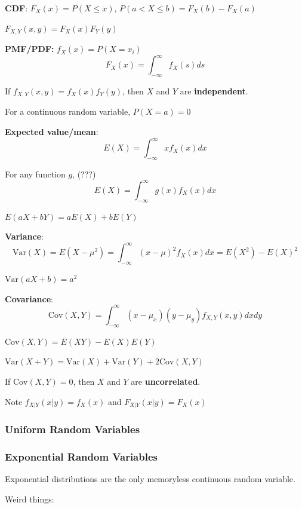 \documentclass{report}
\newcommand{\Var}{\text{Var}}
\newcommand{\Cov}{\text{Cov}}
\begin{document}
\textbf{CDF}: $F_X(x) = P(X \leq x)$, $P(a < X \leq b) = F_X(b) - F_X(a)$

$F_{X,Y}(x,y) = F_X(x)F_Y(y)$

\textbf{PMF/PDF:} $f_X(x) = P(X = x_i)$ $$F_X(x) = \int_{-\infty}^{\infty} f_X(s) ds$$

If $f_{X,Y}(x,y) = f_X(x)f_Y(y)$, then $X$ and $Y$ are \textbf{independent}.

For a continuous random variable, $P(X = a)=0$

\textbf{Expected value/mean}: $$E(X) = \int_{-\infty}^{\infty} x f_X(x) dx$$

For any function $g$, (???)  $$E(X) = \int_{-\infty}^{\infty} g(x) f_X(x) dx$$

$E(aX + bY) = aE(X) + bE(Y)$

\textbf{Variance}: $$\text{Var}(X) = E(X - \mu^2) = \int_{-\infty}^{\infty} (x - \mu)^2 f_X(x) dx = E(X^2) - E(X)^2$$

$\text{Var}(aX + b) = a^2 $

\textbf{Covariance}: $$\text{Cov}(X,Y) = \int_{-\infty}^{\infty} (x - \mu_x)(y -\mu_y) f_{X,Y}(x,y) dx dy $$


$\Cov(X,Y) = E(XY) - E(X)E(Y)$

$\Var(X+Y) = \Var(X) + \Var(Y) + 2 \Cov(X,Y)$

If $\Cov(X,Y)=0$, then $X$ and $Y$ are \textbf{uncorrelated}. 

Note $f_{X|Y}(x|y) = f_X(x)$ and $F_{X|Y}(x|y) = F_X(x)$

\subsubsection{Uniform Random Variables}



\subsubsection{Exponential Random Variables}

Exponential distributions are the only memoryless continuous random variable. 

Weird things:
\end{document}
